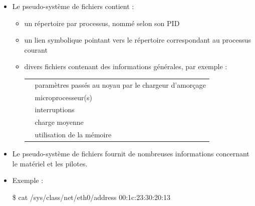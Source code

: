 \begin{frame}{}

\begin{itemize}

\item Le pseudo-système de fichiers  contient :

	\begin{itemize}

	\item un répertoire par processus, nommé selon son PID

	\item un lien symbolique  pointant vers le répertoire
	correspondant au processus courant

	\item divers fichiers contenant des informations générales, par
	exemple :

\bigskip

\begin{tabulary}{\largeurtableau}{lJ}
\hline
{}	& paramètres passés au noyau par le chargeur
				d'amorçage		\\
	& microprocesseur(s)		\\
	& interruptions			\\
	& charge moyenne		\\
	& utilisation de la mémoire	\\
\hline
\end{tabulary}

	\end{itemize}

\end{itemize}

\begin{toile}
\end{toile}

\end{frame}


\begin{frame}[fragile]{}

\begin{itemize}

\item Le pseudo-système de fichiers  fournit de nombreuses
informations concernant le matériel et les pilotes.

\item Exemple :

\begin{intercom}
\$ cat /sys/class/net/eth0/address
00:1c:23:30:20:13
\end{intercom}

\end{itemize}

\begin{toile}
\end{toile}

\end{frame}


